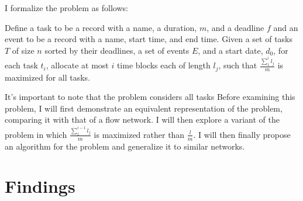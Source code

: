 \documentclass[11pt]{article}
\begin{document}
I formalize the problem as follows:
\begin{tcolorbox}
	Define a task to be a record with a name, a duration, $m$, and a deadline $f$ and an event to be a record with a name, start time, and end time. Given a set of tasks $T$ of size $n$ sorted by their deadlines, a set of events $E$, and a start date, $d_0$, for each task $t_i$, allocate at most $i$ time blocks each of length $l_j$, such that $\frac{\sum_{1}^{i}{l_j}}{m}$ is maximized for all tasks. 
\end{tcolorbox}
It's important to note that the problem considers all tasks 
Before examining this problem, I will first demonstrate an equivalent representation of the problem, comparing it with that of a flow network. I will then explore a variant of the problem in which  $\frac{\sum_{1}^{i -1}{l_j}}{m}$ is maximized rather than  $\frac{l}{m}$. I will then finally propose an algorithm for the problem and generalize it to similar networks. 
\section{Findings}
\end{document}
